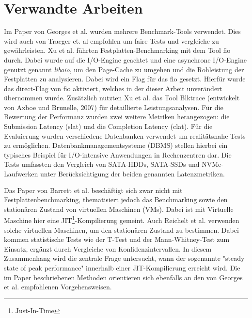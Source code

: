 \chapter{Verwandte Arbeiten}
\label{cha:Verwandte_Arbeiten}

Im Paper von Georges et al. \cite{statistically_rigorous} wurden mehrere Benchmark-Tools verwendet.
Dies wird auch von Traeger et. al \cite{nine-year-of-bench} empfohlen um faire Tests und vergleiche zu gewährleisten.
Xu et al. \cite{ssd_benchmark} führten Festplatten-Benchmarking mit dem Tool fio durch. 
Dabei wurde auf die I/O-Engine geachtet und eine asynchrone I/O-Engine genutzt genannt \textit{libaio},
um den Page-Cache zu umgehen und die Rohleistung der Festplatten zu analysieren.
Dabei wird ein Flag für das fio gesetzt.
Hierfür wurde das direct-Flag von fio aktiviert, 
welches in der dieser Arbeit unverändert übernommen wurde.
Zusätzlich nutzten Xu et al. \cite{ssd_benchmark} das Tool Blktrace 
(entwickelt von Axboe und Brunelle, 2007) für detaillierte Leistungsanalysen.
 Für die Bewertung der Performanz wurden zwei weitere Metriken herangezogen: 
die Submission Latency (slat) und die Completion Latency (clat).
Für die Evaluierung wurden verschiedene Datenbanken verwendet um realitätsnahe Tests zu ermöglichen.
Datenbankmanagementsysteme (DBMS) stellen hierbei ein typisches Beispiel für I/O-intensive Anwendungen in Rechenzentren dar.
Die Tests umfassten den Vergleich von SATA-HDDs, SATA-SSDs und 
NVMe-Laufwerken unter Berücksichtigung der beiden genannten Latenzmetriken.

Das Paper von Barrett et al. \cite{warmAndCold} beschäftigt sich zwar nicht mit Festplattenbenchmarking, thematisiert jedoch das Benchmarking sowie den stationären Zustand von virtuellen Maschinen (VMs).
Dabei ist mit Virtuelle Maschine hier eine JIT\footnote{Just-In-Time}-Kompilierung gemeint.
Auch Reichelt et al. \cite{baseline_paper} verwenden solche virtuellen Maschinen, um den stationären Zustand zu bestimmen. Dabei kommen statistische Tests wie der T-Test und der Mann-Whitney-Test zum Einsatz, 
ergänzt durch Vergleiche von Konfidenzintervallen.
In diesem Zusammenhang wird die zentrale Frage untersucht, wann der sogenannte "steady state of peak performance" innerhalb einer JIT-Kompilierung erreicht wird.
Die im Paper beschriebenen Methoden orientieren sich ebenfalls an den von Georges et al. \cite{statistically_rigorous} empfohlenen Vorgehensweisen.

